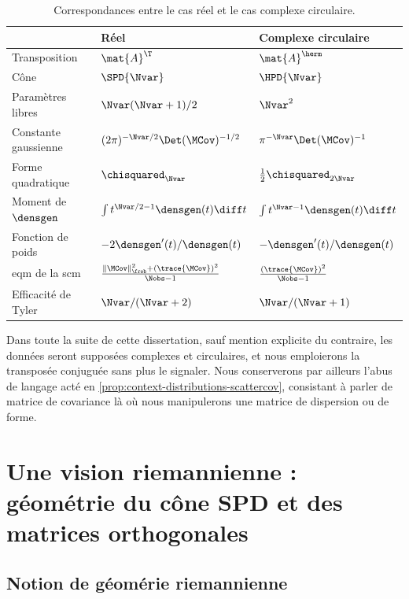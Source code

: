 \begin{table}[h]
  \centering
  \caption{Correspondances entre le cas réel et le cas complexe circulaire.}
  \label{tab:context-complex-summary}
  \small
  \begin{tabular}{@{}lll@{}}
    \toprule
     & Réel & Complexe circulaire \\
    \midrule
    Transposition & $\mat{A}^\T$ & $\mat{A}^\herm$ \\
    Cône & $\SPD{\Nvar}$ & $\HPD{\Nvar}$ \\
    Paramètres libres & $\Nvar(\Nvar+1)/2$ & $\Nvar^2$ \\
    Constante gaussienne & $(2\pi)^{-\Nvar/2}\Det(\MCov)^{-1/2}$ & $\pi^{-\Nvar}\Det(\MCov)^{-1}$ \\
    Forme quadratique & $\chisquared_\Nvar$ & $\tfrac12\chisquared_{2\Nvar}$ \\
    Moment de $\densgen$ & $\int t^{\Nvar/2-1}\densgen(t)\diff t$ & $\int t^{\Nvar-1}\densgen(t)\diff t$ \\
    Fonction de poids & $-2\densgen'(t)/\densgen(t)$ & $-\densgen'(t)/\densgen(t)$ \\
    eqm de la scm & $\frac{\|\MCov\|_\frob^2+(\trace{\MCov})^2}{\Nobs-1}$ & $\frac{(\trace{\MCov})^2}{\Nobs-1}$ \\[1.2ex]
    Efficacité de Tyler & $\Nvar/(\Nvar+2)$ & $\Nvar/(\Nvar+1)$ \\
    \bottomrule
  \end{tabular}
\end{table}

Dans toute la suite de cette dissertation, sauf mention explicite du contraire, les données seront supposées complexes et circulaires, et nous emploierons la transposée conjuguée sans plus le signaler. Nous conserverons par ailleurs l'abus de langage acté en \cref{prop:context-distributions-scattercov}, consistant à parler de matrice de covariance là où nous manipulerons une matrice de dispersion ou de forme.

\section{Une vision riemannienne : géométrie du cône SPD et des matrices orthogonales}
\label{sec:context-riemann}


\subsection{Notion de géomérie riemannienne}
\label{subsec:context-riemann-notion}

